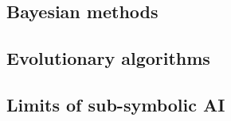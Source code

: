 \subsection{Bayesian methods}\label{subsec:bayesian-methods}

\subsection{Evolutionary algorithms}\label{subsec:evolutionary-algorithms}

\subsection{}\label{subsec:svm}

\subsection{}\label{subsec:neural-networks}

\subsection{Limits of sub-symbolic \Gls{AI}}\label{subsec:limits-of-sub-symbolic-ai}